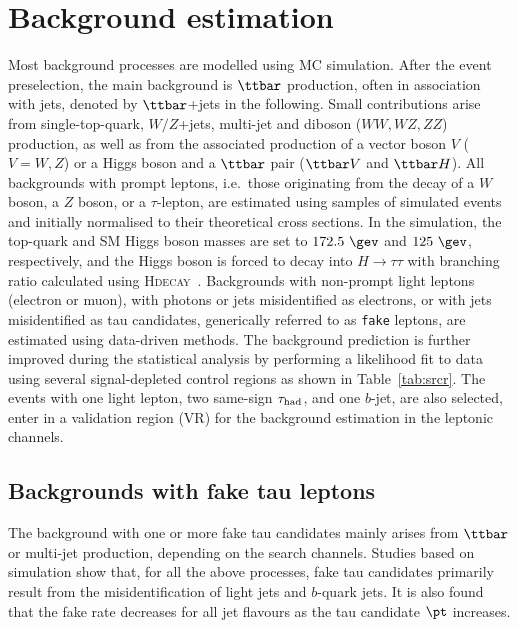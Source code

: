 \section{Background estimation}
\label{sec:background_model}

Most background processes are modelled using MC simulation.
After the event preselection, the main background is $\ttbar$ production, often in association with jets, denoted by $\ttbar$+jets in the following.
Small contributions arise from single-top-quark, $W/Z$+jets, multi-jet and diboson ($WW,WZ,ZZ$) production, as well as from the associated 
production of a vector boson $V$ ($V=W,Z$) or a Higgs boson and a $\ttbar$ pair ($\ttbar V$ and $\ttbar H$). All backgrounds 
with prompt leptons, i.e.\ those originating from the decay of a $W$ boson, a $Z$ boson, or a $\tau$-lepton,
are estimated using samples of simulated events and initially normalised to their theoretical cross sections.
In the simulation, the top-quark and SM Higgs boson masses are set to $172.5~\gev$ and $125~\gev$, respectively,
and the Higgs boson is forced to decay into $H\to \tau\tau$ with branching ratio calculated using \textsc{Hdecay}~\cite{Djouadi:1997yw}.  
Backgrounds with non-prompt light leptons (electron or muon), with photons or jets misidentified as electrons, or with jets misidentified as tau candidates, 
generically referred to as \texttt{fake} leptons, are estimated using data-driven methods. 
The background prediction is further improved during the statistical analysis by performing a likelihood 
fit to data using several signal-depleted control regions as shown in Table~\ref{tab:srcr}.
The events with one light lepton, two same-sign $\tau_{\mathrm{had}}$, and one $b$-jet, are also selected, enter in a validation region (VR) for the background estimation in the leptonic channels. 
\subsection{Backgrounds with fake tau leptons}
\label{sec:faketaus}
The background with one or more fake tau candidates mainly arises from $\ttbar$ or
multi-jet production, depending on the search channels.
Studies based on simulation show that, for all the above processes, fake tau candidates primarily result from the
misidentification of light jets and $b$-quark jets.
It is also found that the fake rate decreases for all jet flavours as the tau candidate $\pt$ increases.

